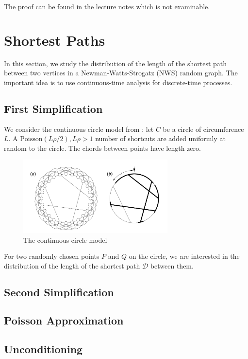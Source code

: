 \documentclass{article}
\begin{document}
The proof can be found in the lecture notes which is not examinable.

\section{Shortest Paths}
In this section, we study the distribution of the length of the shortest path between two vertices in a Newman-Watts-Strogatz (NWS) random graph. The important idea is to use continuous-time analysis for discrete-time processes.  

\subsection{First Simplification}

We consider the continuous circle model from \citep{Newman_2000}: let $C$ be a circle of circumference $L$. A $\mathrm{Poisson}(L\rho/2), L\rho>1$ number of shortcuts are added uniformly at random to the circle. The chords between points have length zero. 

\begin{figure}[h]
    \centering
    \includegraphics[width=0.7\textwidth]{figures/newman1999.png}
    \caption{The continuous circle model \citep{Newman_2000}}
    \label{fig:newman1999}
\end{figure}

For two randomly chosen points $P$ and $Q$ on the circle, we are interested in the distribution of the length of the shortest path $\mathcal{D}$ between them.  

\subsection{Second Simplification}


\subsection{Poisson Approximation}


\subsection{Unconditioning}





\newpage


\end{document}
